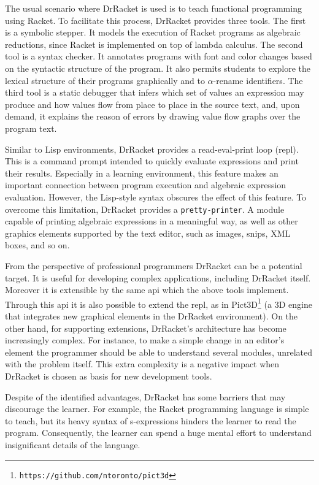 The usual scenario where DrRacket is used is to teach functional programming using Racket. To facilitate this process, DrRacket provides three tools. The first is a symbolic stepper. It models the execution of Racket programs as algebraic reductions, since Racket is implemented on top of lambda calculus. The second tool is a syntax checker. It annotates programs with font and color changes based on the syntactic structure of the program. It also permits students to explore the lexical structure of their programs graphically and to $\alpha$-rename identifiers. The third tool is a static debugger that infers which set of values an expression may produce and how values flow from place to place in the source text, and, upon demand, it explains the reason of errors by drawing value flow graphs over the program text.

Similar to Lisp environments, DrRacket provides a read-eval-print loop (\gls{repl}). This is a command prompt intended to quickly evaluate expressions and print their results. Especially in a learning environment, this feature makes an important connection between program execution and algebraic expression evaluation. However, the Lisp-style syntax obscures the effect of this feature. To overcome this limitation, DrRacket provides a \texttt{pretty-printer}. A module capable of printing algebraic expressions in a meaningful way, as well as other graphics elements supported by the text editor, such as images, snips, XML boxes, and so on.

From the perspective of professional programmers DrRacket can be a potential target. It is useful for developing complex applications, including DrRacket itself. Moreover it is extensible by the same \gls{api} which the above tools implement. Through this \gls{api} it is also possible to extend the \gls{repl}, as in Pict3D\footnote{\texttt{https://github.com/ntoronto/pict3d}} (a 3D engine that integrates new graphical elements in the DrRacket environment). On the other hand, for supporting extensions, DrRacket's architecture has become increasingly complex. For instance, to make a simple change in an editor's element the programmer should be able to understand several modules, unrelated with the problem itself. This extra complexity is a negative impact when DrRacket is chosen as basis for new development tools.

Despite of the identified advantages, DrRacket has some barriers that may discourage the learner. For example, the Racket programming language is simple to teach, but its heavy syntax of s-expressions hinders the learner to read the program. Consequently, the learner can spend a huge mental effort to understand insignificant details of the language.
